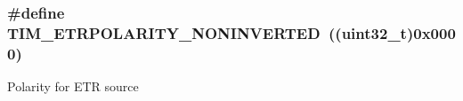 \subsubsection[{\texorpdfstring{T\+I\+M\+\_\+\+E\+T\+R\+P\+O\+L\+A\+R\+I\+T\+Y\+\_\+\+N\+O\+N\+I\+N\+V\+E\+R\+T\+ED}{TIM_ETRPOLARITY_NONINVERTED}}]{\setlength{\rightskip}{0pt plus 5cm}\#define T\+I\+M\+\_\+\+E\+T\+R\+P\+O\+L\+A\+R\+I\+T\+Y\+\_\+\+N\+O\+N\+I\+N\+V\+E\+R\+T\+ED~((uint32\+\_\+t)0x0000)}\hypertarget{group___t_i_m___e_t_r___polarity_ga7fa7c43245b25564414b2e191d5d8b14}{}\label{group___t_i_m___e_t_r___polarity_ga7fa7c43245b25564414b2e191d5d8b14}
Polarity for E\+TR source 